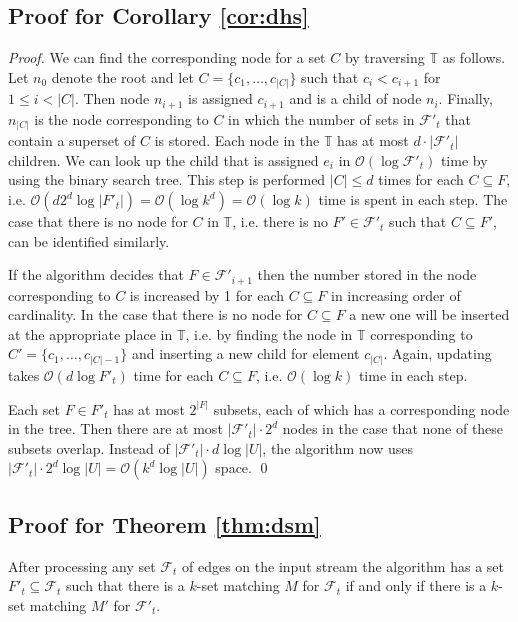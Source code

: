 \documentclass[draft,a4paper]{llncs}
\newcommand{\F}{\ensuremath{\mathcal{F}}\xspace}
\newcommand{\Oh}{\mathcal{O}}
\begin{document}
\subsection{Proof for Corollary \ref{cor:dhs}}

\begin{proof}
 We can find the corresponding node for a set $C$ by traversing $\mathbb{T}$ as follows. Let $n_0$ denote the root and let 
$C = \{c_1, \ldots, c_{|C|}\}$ such that $c_i < c_{i+1}$ for $1 \leq i < |C|$. Then node $n_{i+1}$ is assigned $c_{i+1}$ and is a 
child of node $n_i$. Finally, $n_{|C|}$ is the node corresponding to $C$ in which the number of sets in $\F'_t$ that contain a
superset of $C$ is stored. Each node in the $\mathbb{T}$ has at most $d \cdot |\F'_t|$ children. We can look up the child that is 
assigned $e_i$ in $\Oh(\log \F'_t)$ time by using the binary search tree. This step is performed $|C| \leq d$ times for each 
$C \subseteq F$, i.e. $\Oh(d 2^d  \log |F'_t|) = \Oh(\log k^d) = \Oh(\log k)$ time is spent in each step. The case that there is no node for $C$ in $\mathbb{T}$, i.e. there is no $F' \in \F'_t$ such that $C \subseteq F'$, can be identified similarly.

If the algorithm decides that $F \in \F'_{i+1}$ then the number stored in the node corresponding to $C$ is increased by 1 for 
each $C \subseteq F$ in increasing order of cardinality. In the case that there is no node for $C \subseteq F$ a new one will be
inserted at the appropriate place in $\mathbb{T}$, i.e. by finding the node in $\mathbb{T}$ corresponding to $C' = \{c_1, \ldots, c_{|C|-1}\}$ and inserting a new child for element $c_{|C|}$. Again, updating takes $\Oh(d \log F'_t)$ time for each $C \subseteq F$, i.e. $\Oh(\log k)$ time in each step.

Each set $F \in F'_t$ has at most $2^{|F|}$ subsets, each of which has a corresponding node in the tree. Then there are at most
$|\F'_t| \cdot 2^d$ nodes in the case that none of these subsets overlap. Instead of $|\F'_t| \cdot d \log |U|$, the algorithm now uses $|\F'_t| \cdot 2^d \log |U| = \Oh(k^d \log |U|)$ space. \qed
\end{proof}

\subsection{Proof for Theorem \ref{thm:dsm}}

\begin{lemma}
 After processing any set $\F_t$ of edges on the input stream the algorithm has a set $F'_t \subseteq \F_t$ such that there is a $k$-set matching $M$ for $\F_t$ if and only if there is a $k$-set matching $M'$ for $\F'_t$.
\end{lemma}
\end{document}

